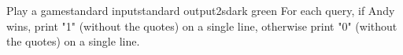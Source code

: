 \begin{problem}{Play a game}{standard input}{standard output}{2s}{dark green}
\OutputFile
For each query, if Andy wins, print "1" (without the quotes) on a single line, 
otherwise print "0" (without the quotes) on a single line.

\Example

\begin{example}
%
\end{example}
\end{problem}
